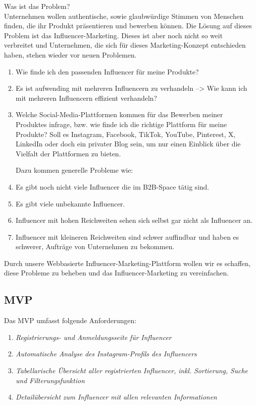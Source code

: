 \documentclass[conference,a4paper,flushend]{cs-techrep}
\begin{document}
Was ist das Problem?\\
Unternehmen wollen authentische, sowie glaubwürdige Stimmen von Menschen finden, die ihr Produkt präsentieren und bewerben können. Die Lösung auf dieses Problem ist das Influencer-Marketing. Dieses ist aber noch nicht so weit verbreitet und Unternehmen, die sich für dieses Marketing-Konzept entschieden haben, stehen wieder vor neuen Problemen.

\begin{enumerate}

\item{Wie finde ich den passenden Influencer für meine Produkte?}
\item{Es ist aufwending mit mehreren Influencern zu verhandeln --> Wie kann ich mit mehreren Influencern effizient verhandeln?}
\item{Welche Social-Media-Plattformen kommen für das Bewerben meiner Produktes infrage, bzw. wie finde ich die richtige Plattform für meine Produkte? Soll es Instagram, Facebook, TikTok, YouTube, Pinterest, X, LinkedIn oder doch ein privater Blog sein, um nur einen Einblick über die Vielfalt der Plattformen zu bieten. \\}

Dazu kommen generelle Probleme wie:

\item{Es gibt noch nicht viele Influencer die im B2B-Space tätig sind.}
\item{Es gibt viele unbekannte Influencer.}
\item{Influencer mit hohen Reichweiten sehen sich selbst gar nicht als Influencer an.}
\item{Influencer mit kleineren Reichweiten sind schwer auffindbar und haben es schwerer, Aufträge von Unternehmen zu bekommen.}

\end{enumerate}

Durch unsere Webbasierte Influencer-Marketing-Plattform wollen wir es schaffen, diese Probleme zu beheben und das Influencer-Marketing zu vereinfachen.

\subsection{MVP}
Das MVP umfasst folgende Anforderungen:
\begin{enumerate}
\item{\textit{Registrierungs- und Anmeldungsseite für Influencer}}
\item{\textit{Automatische Analyse des Instagram-Profils des Influencers}}
\item{\textit{Tabellarische Übersicht aller registrierten Influencer, inkl. Sortierung, Suche und Filterungsfunktion}}
\item{\textit{Detailübersicht zum Influencer mit allen relevanten Informationen}}
\end{enumerate}
\end{document}
